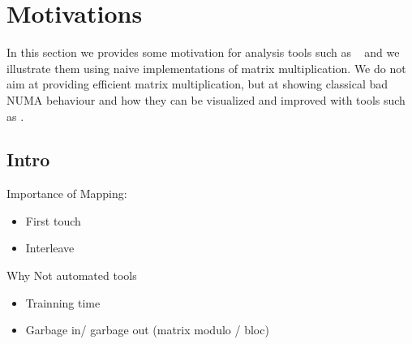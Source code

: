 
\section{Motivations}
\label{sec:motivations}

In this section we provides some motivation for analysis tools such as
\TABARNAC~ and we illustrate them using naive implementations of matrix
multiplication. We do not aim at providing efficient matrix multiplication,
but at showing classical bad NUMA behaviour and how they can be visualized and
improved with tools such as \TABARNAC.

\subsection{Intro}
\label{sec:motivations-intro}

Importance of Mapping:
\begin{itemize}
    \item First touch
    \item Interleave
\end{itemize}

Why Not automated tools
\begin{itemize}
    \item Trainning time
    \item Garbage in/ garbage out (matrix modulo / bloc)
\end{itemize}
